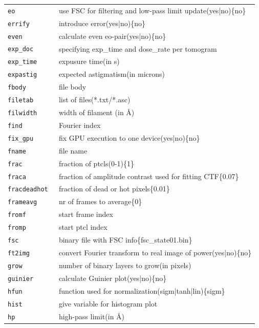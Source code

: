 \documentclass[a4paper,11pt]{article}
\begin{document}
\begin{tabular}{ll}
\texttt{eo           }&{ use FSC for filtering and low-pass limit update(yes|no)\{no\}}\\
\texttt{errify       }&{ introduce error(yes|no)\{no\}}\\
\texttt{even         }&{ calculate even eo-pair(yes|no)\{no\}}\\
\texttt{exp\_doc      }&{ specifying exp\_time and dose\_rate per tomogram}\\
\texttt{exp\_time     }&{ expusure time(in s)}\\
\texttt{expastig     }&{ expected astigmatism(in microns)}\\
\texttt{fbody        }&{ file body}\\
\texttt{filetab      }&{ list of files(*.txt/*.asc)}\\
\texttt{filwidth     }&{ width of filament (in \AA{})}\\
\texttt{find         }&{ Fourier index}\\
\texttt{fix\_gpu      }&{ fix GPU execution to one device(yes|no)\{no\}}\\
\texttt{fname        }&{ file name}\\
\texttt{frac         }&{ fraction of ptcls(0-1)\{1\}}\\
\texttt{fraca        }&{ fraction of amplitude contrast used for fitting CTF\{0.07\}}\\
\texttt{fracdeadhot  }&{ fraction of dead or hot pixels\{0.01\}}\\
\texttt{frameavg     }&{ nr of frames to average\{0\}}\\
\texttt{fromf        }&{ start frame index}\\
\texttt{fromp        }&{ start ptcl index}\\
\texttt{fsc          }&{ binary file with FSC info\{fsc\_state01.bin\}}\\
\texttt{ft2img       }&{ convert Fourier transform to real image of power(yes|no)\{no\}}\\
\texttt{grow         }&{ number of binary layers to grow(in pixels)}\\
\texttt{guinier      }&{ calculate Guinier plot(yes|no)\{no\}}\\
\texttt{hfun         }&{ function used for normalization(sigm|tanh|lin)\{sigm\}}\\
\texttt{hist         }&{ give variable for histogram plot}\\
\texttt{hp           }&{ high-pass limit(in \AA{})}\\

\end{tabular}
\end{document}
